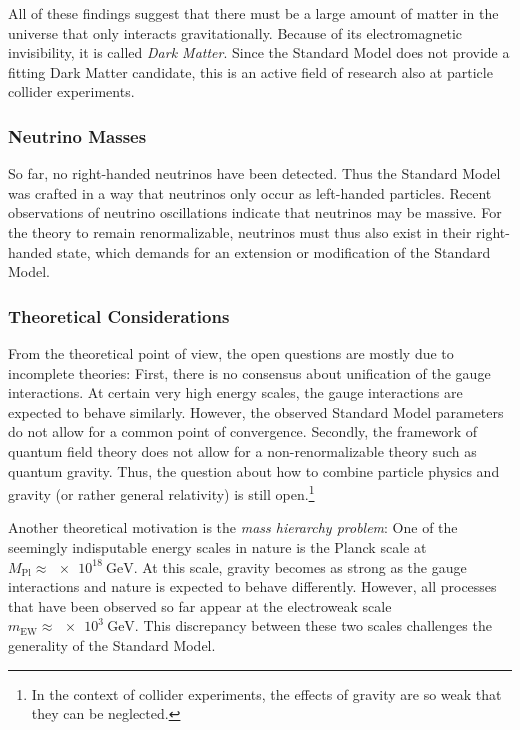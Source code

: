 All of these findings suggest that there must be a large amount of matter in the universe that only interacts gravitationally. Because of its electromagnetic invisibility, it is called \emph{Dark Matter}.
Since the Standard Model does not provide a fitting Dark Matter candidate, this is an active field of research also at particle collider experiments.

\subsubsection{Neutrino Masses}
So far, no right-handed neutrinos have been detected. Thus the Standard Model was crafted in a way that neutrinos only occur as left-handed particles.
Recent observations of neutrino oscillations\cite{KamLAND:ReactorAntineutrinoMeasurement,DoubleChooz:Improvedmeasurementsneutrino,IceCube:Determiningneutrinooscillation,DayaBay:NewMeasurementAntineutrino} indicate that neutrinos may be massive. For the theory to remain renormalizable, neutrinos must thus also exist in their right-handed state\cite{Klinkhamer:NeutrinomassStandard}, which demands for an extension or modification of the Standard Model.

\subsubsection{Theoretical Considerations}
From the theoretical point of view, the open questions are mostly due to incomplete theories: 
First, there is no consensus about unification of the gauge interactions. At certain very high energy scales, the gauge interactions are expected to behave similarly. However, the observed Standard Model parameters do not allow for a common point of convergence\cite{Amaldi:Comparisongrandunified}.
Secondly, the framework of quantum field theory does not allow for a non-renormalizable theory such as quantum gravity. Thus, the question about how to combine particle physics and gravity (or rather general relativity) is still open.\footnote{In the context of collider experiments, the effects of gravity are so weak that they can be neglected.}

Another theoretical motivation is the \emph{mass hierarchy problem}: One of the seemingly indisputable energy scales in nature is the Planck scale at $M_\text{Pl} \approx \SI{e18}{\GeV}$. At this scale, gravity becomes as strong as the gauge interactions and nature is expected to behave differently. However, all processes that have been observed so far appear at the electroweak scale $m_\text{EW} \approx \SI{e3}{\GeV}$. This discrepancy between these two scales challenges the generality of the Standard Model.

